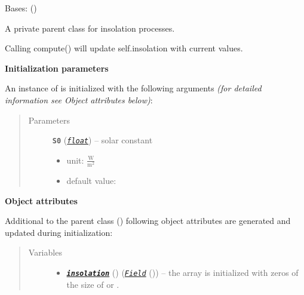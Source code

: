 \documentclass[a4paper,10pt,english]{sphinxmanual}
\begin{document}
\begin{fulllineitems}
\label{api/climlab.radiation:climlab.radiation.insolation._Insolation}
Bases: {\hyperref[api/climlab.process:climlab.process.diagnostic.DiagnosticProcess]{\emph{}}} ()

A private parent class for insolation processes.

Calling compute() will update self.insolation with current values.

\textbf{Initialization parameters}

An instance of  is initialized with the following 
arguments \emph{(for detailed information see Object attributes below)}:
\begin{quote}\begin{description}
\item[{Parameters}] \leavevmode
\textbf{\texttt{S0}} (\href{http://docs.python.org/2.7/library/functions.html\#float}{\emph{\texttt{float}}}) -- 
solar constant
\begin{itemize}
\item {} 
unit: \(\frac{\textrm{W}}{\textrm{m}^2}\)

\item {} 
default value: 

\end{itemize}


\end{description}\end{quote}

\textbf{Object attributes}

Additional to the parent class {\hyperref[api/climlab.process:climlab.process.diagnostic.DiagnosticProcess]{\emph{}}} ()
following object attributes are generated and updated during initialization:
\begin{quote}\begin{description}
\item[{Variables}] \leavevmode\begin{itemize}
\item {} 
{\hyperref[api/climlab.radiation:climlab.radiation.insolation.P2Insolation.insolation]{\emph{\textbf{\texttt{insolation}}}}} () ({\hyperref[api/climlab.domain:climlab.domain.field.Field]{\emph{\emph{\texttt{Field}}}}} ()) -- the array is initialized with zeros of the size of
 or .


\end{itemize}
\end{description}
\end{quote}
\end{fulllineitems}
\end{document}

